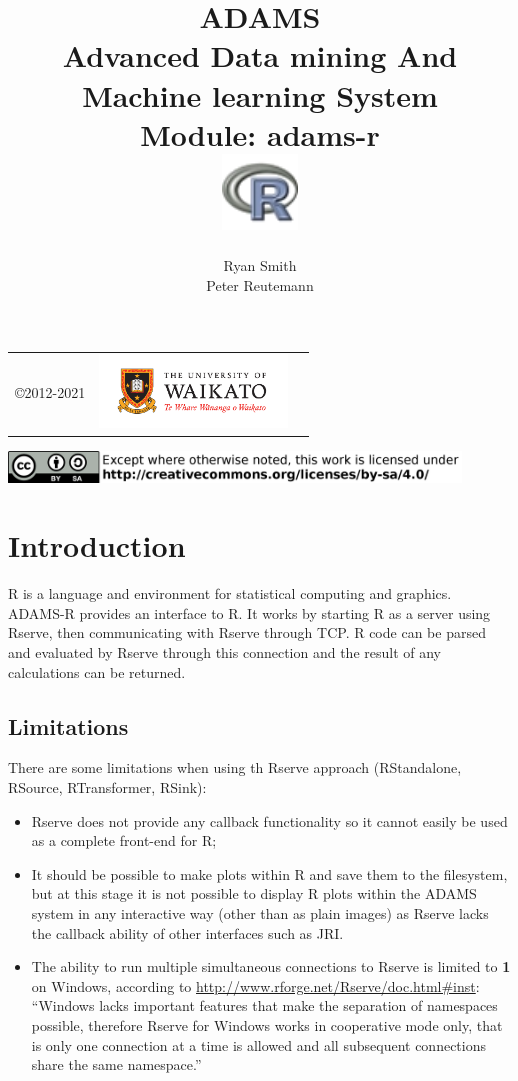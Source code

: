\documentclass[a4paper]{book}
\title{
  \textbf{ADAMS} \\
  {\Large \textbf{A}dvanced \textbf{D}ata mining \textbf{A}nd \textbf{M}achine
  learning \textbf{S}ystem} \\
  {\Large Module: adams-r} \\
  \vspace{1cm}
  \includegraphics[width=2cm]{images/r-module.png} \\
}
\author{
  Ryan Smith \\
  Peter Reutemann
}
\begin{document}
\begin{titlepage}
\maketitle

\thispagestyle{empty}
\center
\begin{table}[b]
	\begin{tabular}{c l l}
		\parbox[c][2cm]{2cm}{\copyright 2012-2021} &
		\parbox[c][2cm]{5cm}{\includegraphics[width=5cm]{images/coat_of_arms.pdf}}
	\end{tabular}
	\includegraphics[width=12cm]{images/cc.png} \\
\end{table}

\end{titlepage}

\tableofcontents
\listoffigures

\chapter{Introduction}
R is a language and environment for statistical computing and graphics. ADAMS-R provides an interface to R. It works by starting R as a server using
Rserve\cite{rserve}, then communicating with Rserve through TCP. R code can be parsed and evaluated
by Rserve through this connection and the result of any calculations can be
returned. 

\section{Limitations}
There are some limitations when using th Rserve approach (RStandalone, RSource, RTransformer, RSink):
\begin{itemize}
	\item Rserve does not provide any callback
functionality so it cannot easily be used as a complete front-end for R;
	\item It should be possible to make plots within R and save them to the
filesystem, but at this stage it is not possible to display R plots within the ADAMS system in
any interactive way (other than as plain images) as Rserve lacks the callback
ability of other interfaces such as JRI.
\item The ability to run multiple simultaneous connections to Rserve is limited
to \textbf{1} on Windows, according to \url{http://www.rforge.net/Rserve/doc.html#inst}:
``Windows lacks important features that make the separation of namespaces possible, therefore Rserve for Windows works in cooperative mode only, that is only one connection at a time is allowed and all subsequent connections share the same namespace.''
\end{itemize}
\end{document}
